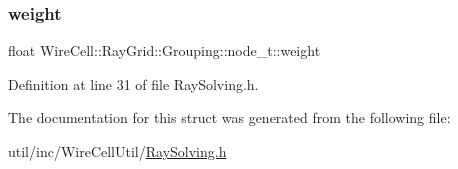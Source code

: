 \subsubsection{\texorpdfstring{weight}{weight}}
{\footnotesize\ttfamily float Wire\+Cell\+::\+Ray\+Grid\+::\+Grouping\+::node\+\_\+t\+::weight}



Definition at line 31 of file Ray\+Solving.\+h.



The documentation for this struct was generated from the following file\+:\begin{DoxyCompactItemize}
\item 
util/inc/\+Wire\+Cell\+Util/\hyperlink{_ray_solving_8h}{Ray\+Solving.\+h}\end{DoxyCompactItemize}
